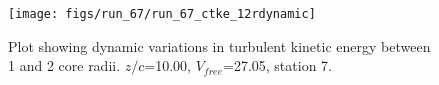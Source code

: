 \begin{figure}[H]
\centering
\texttt{[image: figs/run\_67/run\_67\_ctke\_12rdynamic]}
\caption{Plot showing dynamic variations in turbulent kinetic energy between 1 and 2 core radii. $z/c$=10.00, $V_{free}$=27.05, station 7.}
\label{fig:run_67_ctke_12rdynamic}
\end{figure}


